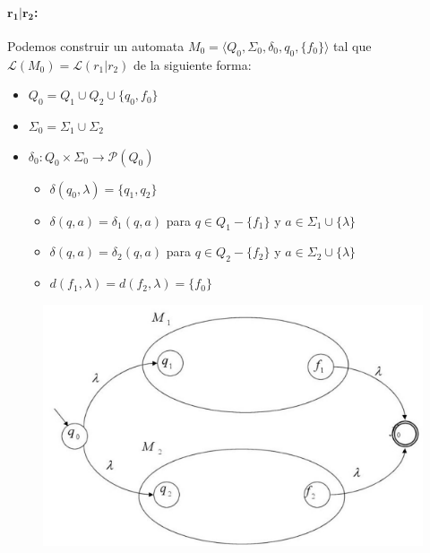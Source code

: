 \paragraph{\(\bm{r_1|r_2}\):} Podemos construir un automata \(M_0=\langle Q_0, \Sigma_0, \delta_0, q_0, \{f_0\}\rangle\) tal que \(\mathcal{L}(M_0) = \mathcal{L}(r_1|r_2)\) de la siguiente forma:
\begin{itemize}
  \item \(Q_0 = Q_1 \cup Q_2 \cup \{q_0, f_0\}\)
  \item \(\Sigma_0 = \Sigma_1 \cup \Sigma_2\)
  \item \(\delta_0: Q_0 \times \Sigma_0 \rightarrow \mathcal{P}(Q_0)\)
        \begin{itemize}
          \item[] \(\delta(q_0, \lambda) = \{q_1, q_2\}\)
          \item[] \(\delta(q, a) = \delta_1(q, a)\) para \(q\in Q_1-\{f_1\}\) y \(a\in \Sigma_1\cup\{\lambda\}\)
          \item[] \(\delta(q, a) = \delta_2(q, a)\) para \(q\in Q_2-\{f_2\}\) y \(a\in \Sigma_2\cup\{\lambda\}\)
          \item[] \(d(f_1,\lambda) = d(f_2,\lambda) = \{f_0\}\)
        \end{itemize}
\end{itemize}
\begin{figure}[H]
  \begin{center}
    \includegraphics[scale=0.5]{imagenes/union}
  \end{center}
\end{figure}

